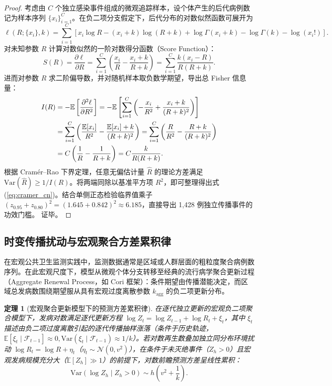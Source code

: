 \documentclass[11pt,a4paper]{article}
\theoremstyle{plain}
\newtheorem{theorem}{定理}
\theoremstyle{definition}
\begin{document}
\begin{proof}
考虑由 $C$ 个独立感染事件组成的微观追踪样本，设个体产生的后代病例数记为样本序列 $\{x_i\}_{i=1}^C$。在负二项分支假定下，后代分布的对数似然函数可展开为
\begin{equation}
\ell(R; \{x_i\}, k) = \sum_{i=1}^C \left[ x_i \log R - (x_i + k)\log(R+k) + \log \Gamma(x_i+k) - \log \Gamma(k) - \log(x_i!) \right].
\end{equation}
对未知参数 $R$ 计算对数似然的一阶对数得分函数（Score Function）：
\begin{equation}
S(R) = \frac{\partial \ell}{\partial R} = \sum_{i=1}^C \left( \frac{x_i}{R} - \frac{x_i + k}{R + k} \right) = \sum_{i=1}^C \frac{k(x_i - R)}{R(R + k)}.
\end{equation}
进而对参数 $R$ 求二阶偏导数，并对随机样本取负数学期望，导出总 Fisher 信息量：
\begin{align}
I(R) &= -\mathbb{E}\left[\frac{\partial^2 \ell}{\partial R^2}\right] = -\mathbb{E}\left[ \sum_{i=1}^C \left( -\frac{x_i}{R^2} + \frac{x_i + k}{(R+k)^2} \right) \right] \notag \\
&= \sum_{i=1}^C \left( \frac{\mathbb{E}[x_i]}{R^2} - \frac{\mathbb{E}[x_i] + k}{(R+k)^2} \right) = \sum_{i=1}^C \left( \frac{R}{R^2} - \frac{R + k}{(R+k)^2} \right) \notag \\
&= C \left(\frac{1}{R} - \frac{1}{R+k}\right) = C \frac{k}{R(R+k)}.
\end{align}
根据 Cram\'er--Rao 下界定理，任意无偏估计量 $\hat{R}$ 的理论方差满足 $\text{Var}(\hat{R}) \ge 1/I(R)$。将两端同除以基准平方项 $R^2$，即可整理得出式 (\ref{eq:cramer_cn})。结合单侧正态检验临界值乘子 $(z_{0.95} + z_{0.80})^2 = (1.645 + 0.842)^2 \approx 6.185$，直接导出 1,428 例独立传播事件的功效门槛。
证毕。
\end{proof}

\subsection{时变传播扰动与宏观聚合方差累积律}

在宏观公共卫生监测实践中，监测数据通常是区域或人群层面的粗粒度聚合病例数序列。在此宏观尺度下，模型从微观个体分支转移至经典的流行病学聚合更新过程（Aggregate Renewal Process，如 Cori 框架）：条件期望由传播潜能决定，而区域总发病数围绕期望服从具有宏观过度离散参数 $k_{\text{agg}}$ 的负二项更新分布。

\begin{theorem}[宏观聚合更新模型下的预测方差累积律]\label{thm:t5}
在逐代独立更新的宏观负二项聚合模型下，发病对数满足逐代更新方程 $\log Z_t = \log Z_{t-1} + \log R_t + \xi_t$，其中 $\xi_t$ 描述由负二项过度离散引起的逐代传播抽样涨落（条件于历史轨迹，$\mathbb{E}[\xi_t \mid \mathcal{F}_{t-1}] \approx 0, \text{Var}(\xi_t \mid \mathcal{F}_{t-1}) \approx 1/k$）。若对数再生数叠加独立同分布环境扰动 $\log R_t = \log R + \eta_t$（$\eta_t \sim \mathcal{N}(0, v^2)$），在条件于未灭绝事件（$Z_h > 0$）且宏观发病规模充分大（$\mathbb{E}[Z_h] \gg 1$）的前提下，对数前瞻预测方差呈线性累积：
\begin{equation}
\text{Var}(\log Z_h \mid Z_h > 0) \sim h \left(v^2 + \frac{1}{k}\right).
\end{equation}
\end{theorem}
\end{document}
